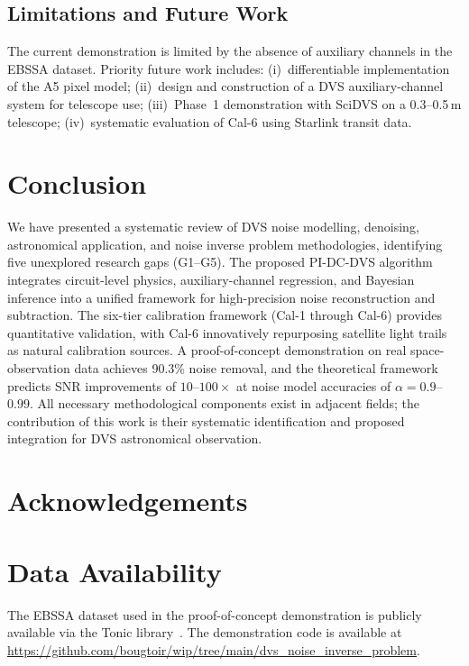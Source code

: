 \documentclass[12pt]{article}
\begin{document}
\subsection{Limitations and Future Work}

The current demonstration is limited by the absence of auxiliary channels in the EBSSA dataset.
Priority future work includes: (i)~differentiable implementation of the A5 pixel model; (ii)~design and construction of a DVS auxiliary-channel system for telescope use; (iii)~Phase~1 demonstration with SciDVS on a 0.3--0.5\,m telescope; (iv)~systematic evaluation of Cal-6 using Starlink transit data.


\section{Conclusion}
\label{sec:conclusion}

We have presented a systematic review of DVS noise modelling, denoising, astronomical application, and noise inverse problem methodologies, identifying five unexplored research gaps (G1--G5).
The proposed PI-DC-DVS algorithm integrates circuit-level physics, auxiliary-channel regression, and Bayesian inference into a unified framework for high-precision noise reconstruction and subtraction.
The six-tier calibration framework (Cal-1 through Cal-6) provides quantitative validation, with Cal-6 innovatively repurposing satellite light trails as natural calibration sources.
A proof-of-concept demonstration on real space-observation data achieves 90.3\% noise removal, and the theoretical framework predicts SNR improvements of $10$--$100\times$ at noise model accuracies of $\alpha = 0.9$--$0.99$.
All necessary methodological components exist in adjacent fields; the contribution of this work is their systematic identification and proposed integration for DVS astronomical observation.


\section*{Acknowledgements}

\section*{Data Availability}
The EBSSA dataset used in the proof-of-concept demonstration is publicly available via the Tonic library~\cite{C1}.
The demonstration code is available at \url{https://github.com/bougtoir/wip/tree/main/dvs_noise_inverse_problem}.
\end{document}
